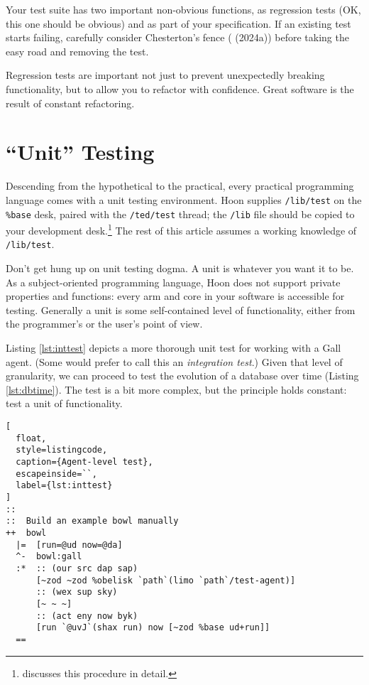 \documentclass[twoside]{article}
\begin{document}
Your test suite has two important non-obvious functions, as regression tests (OK, this one should be obvious) and as part of your specification. If an existing test starts failing, carefully consider Chesterton's fence (\citeauthor{WikipediaChesterton} (2024a)) before taking the easy road and removing the test.

Regression tests are important not just to prevent unexpectedly breaking functionality, but to allow you to refactor with confidence. Great software is the result of constant refactoring.

\section{“Unit” Testing}

Descending from the hypothetical to the practical, every practical programming language comes with a unit testing environment. Hoon supplies \lstinline[style=inlinecode]{/lib/test} on the \lstinline[style=inlinecode]{%base} desk, paired with the \lstinline[style=inlinecode]{/ted/test} thread; the \texttt{/lib} file should be copied to your development desk.\footnote{\citet{Davis2022} discusses this procedure in detail.} The rest of this article assumes a working knowledge of \lstinline[style=inlinecode]{/lib/test}.

Don't get hung up on unit testing dogma. A unit is whatever you want it to be. As a subject-oriented programming language, Hoon does not support private properties and functions: every arm and core in your software is accessible for testing. Generally a unit is some self-contained level of functionality, either from the programmer's or the user's point of view.

Listing \ref{lst:inttest} depicts a more thorough unit test for working with a Gall agent.  (Some would prefer to call this an \emph{integration test}.)  Given that level of granularity, we can proceed to test the evolution of a database over time (Listing \ref{lst:dbtime}).  The test is a bit more complex, but the principle holds constant:  test a unit of functionality.

\begin{lstlisting}[
  float,
  style=listingcode,
  caption={Agent-level test},
  escapeinside=``,
  label={lst:inttest}
]
::
::  Build an example bowl manually
++  bowl
  |=  [run=@ud now=@da]
  ^-  bowl:gall
  :*  :: (our src dap sap)
      [~zod ~zod %obelisk `path`(limo `path`/test-agent)]
      :: (wex sup sky)
      [~ ~ ~]
      :: (act eny now byk)
      [run `@uvJ`(shax run) now [~zod %base ud+run]]
  ==
\end{lstlisting}
\end{document}
